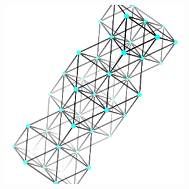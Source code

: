 \begin{minipage}{.5\textwidth}
 \begin{center}
  \includegraphics[width=0.6\textwidth]{photos/copper_structure.png}
 \end{center}

\end{minipage}

